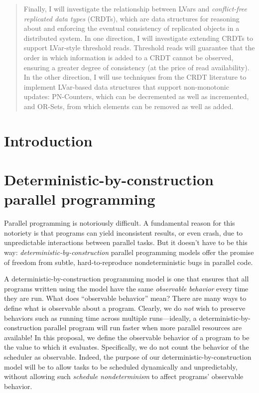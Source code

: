 \documentclass{article}
\begin{document}
\begin{abstract}
  Finally, I will investigate the relationship between LVars and
  \emph{conflict-free replicated data types} (CRDTs), which are data
  structures for reasoning about and enforcing the eventual
  consistency of replicated objects in a distributed system.  In one
  direction, I will investigate extending CRDTs to support LVar-style
  threshold reads.  Threshold reads will guarantee that the order in
  which information is added to a CRDT cannot be observed, ensuring a
  greater degree of consistency (at the price of read availability).
  In the other direction, I will use techniques from the CRDT
  literature to implement LVar-based data structures that support
  non-monotonic updates: PN-Counters, which can be decremented as well
  as incremented, and OR-Sets, from which elements can be removed as
  well as added.
\end{abstract}

\section{Introduction}

\section{Deterministic-by-construction parallel programming}

Parallel programming is notoriously difficult.  
A fundamental reason for this notoriety is that programs can yield
inconsistent results, or even crash, due to unpredictable interactions
between parallel tasks.  But it doesn't have to be this way:
\emph{deterministic-by-construction} parallel programming models offer
the promise of freedom from subtle, hard-to-reproduce nondeterministic
bugs in parallel code.

A deterministic-by-construction programming model is one that ensures
that all programs written using the model have the same
\emph{observable behavior} every time they are run.  What does
``observable behavior'' mean?  There are many ways to define what is
observable about a program.  Clearly, we do \emph{not} wish to
preserve behaviors such as running time across multiple
runs---ideally, a deterministic-by-construction parallel program will
run faster when more parallel resources are available!  In this
proposal, we define the observable behavior of a program to be the
value to which it evaluates.  Specifically, we do not count the
behavior of the scheduler as observable.  Indeed, the purpose of our
deterministic-by-construction model will be to allow tasks to be
scheduled dynamically and unpredictably, without allowing such
\emph{schedule nondeterminism} to affect programs' observable
behavior.
\end{document}
